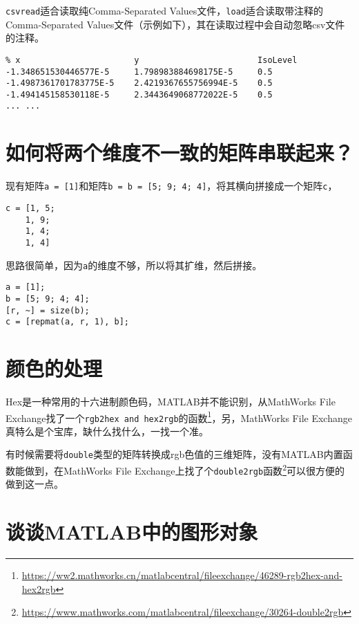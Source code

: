 \texttt{csvread}适合读取纯Comma-Separated Values文件，\texttt{load}适合读取带注释的Comma-Separated Values文件（示例如下），其在读取过程中会自动忽略csv文件的注释。

\begin{verbatim}
% x                       y                        IsoLevel
-1.348651530446577E-5     1.798983884698175E-5     0.5
-1.4987361701783775E-5    2.4219367655756994E-5    0.5
-1.494145158530118E-5     2.3443649068772022E-5    0.5
... ...
\end{verbatim}

\section{如何将两个维度不一致的矩阵串联起来？}

现有矩阵\texttt{a = [1]}和矩阵\texttt{b = b = [5; 9; 4; 4]}，将其横向拼接成一个矩阵\texttt{c}，

\begin{verbatim}
c = [1, 5;
    1, 9;
    1, 4;
    1, 4]
\end{verbatim}

思路很简单，因为\texttt{a}的维度不够，所以将其扩维，然后拼接。

\begin{verbatim}
a = [1];
b = [5; 9; 4; 4];
[r, ~] = size(b);
c = [repmat(a, r, 1), b];
\end{verbatim}

\section{颜色的处理}

Hex是一种常用的十六进制颜色码，MATLAB并不能识别，从MathWorks File Exchange找了一个\texttt{rgb2hex and hex2rgb}的函数\footnote{\url{https://ww2.mathworks.cn/matlabcentral/fileexchange/46289-rgb2hex-and-hex2rgb}}，另，MathWorks File Exchange真特么是个宝库，缺什么找什么，一找一个准。

有时候需要将\texttt{double}类型的矩阵转换成rgb色值的三维矩阵，没有MATLAB内置函数能做到，在MathWorks File Exchange上找了个\texttt{double2rgb}函数\footnote{\url{https://www.mathworks.com/matlabcentral/fileexchange/30264-double2rgb}}可以很方便的做到这一点。

\section{谈谈MATLAB中的图形对象}


